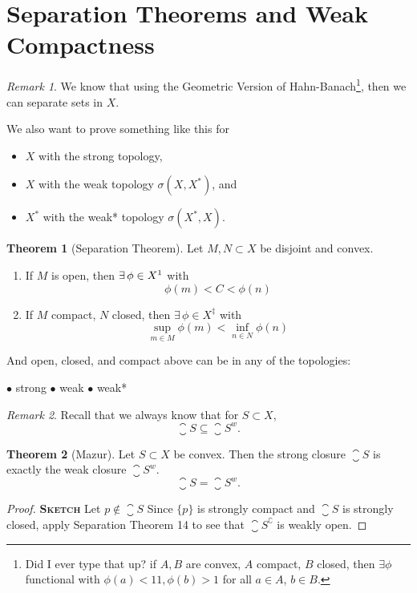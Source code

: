 \documentclass[a5paper]{article}
\theoremstyle{definition}%
\newtheorem{theorem}{Theorem}
\numberwithin{exercise}{section}
\theoremstyle{remark}%
\newtheorem*{remark*}{Remark}
\begin{document}
\section{Separation Theorems and Weak Compactness}
\begin{remark*}
We know that using the Geometric Version of Hahn-Banach\footnote{Did I ever type that up? if $A,B$ are convex, $A$ compact, $B$ closed, then $\exists \phi$ functional with $\phi(a)<1 1, \phi(b) >1$ for all $a\in A$, $b\in B$.}, then we can separate sets in $X$. 

We also want to prove something like this for 
\begin{itemize}
	\item $X$ with the strong topology, 
	\item $X$ with the weak topology $\sigma(X,X^*)$, and 
	\item $X^*$ with the weak* topology $\sigma(X^*,X).$
\end{itemize}
\end{remark*}

\begin{highlight}
\begin{theorem}[Separation Theorem]
Let $M,N\subset X$ be disjoint and convex. 
	\begin{enumerate}
	\item If $M$ is open, then $\exists\, \phi\in X\footnotemark$ with 
	$$\phi(m)<C<\phi(n)$$
	\item If $M$ compact, $N$ closed, then $\exists\, \phi\in X^\ddagger$ with 
	$$\sup_{m\in M} \phi(m) < \inf_{n\in N} \phi(n)$$
	\end{enumerate}
And open, closed, and compact above can be in any of the topologies:

\hfill $\bullet$ strong \hfill $\bullet$ weak \hfill $\bullet$ weak* \hfill \mbox{}
\end{theorem}
\end{highlight}

\begin{remark*}
Recall that we always know that for $S\subset X$, 
$$\closure{S}\subseteq\closure{S}^w.$$
\end{remark*}

\begin{highlight}
\begin{theorem}[Mazur]
Let $S\subset X$ be convex. Then the strong closure $\closure{S}$ is exactly the weak closure $\closure{S}^w$.
$$\closure{S}=\closure{S}^w.$$
\end{theorem}
\end{highlight}
\begin{proof}\textbf{\textsc{Sketch}} Let $p\not\in\closure{S}$ Since $\{p\}$ is strongly compact and $\closure{S}$ is strongly closed, apply Separation Theorem 14 to see that $\closure{S}^\complement$ is weakly open. 
\end{proof}
\end{document}
